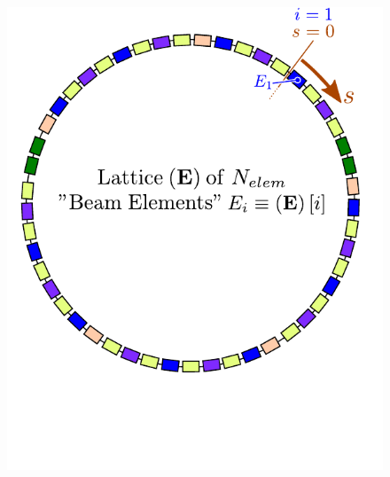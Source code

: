 \documentclass{beamer}
\begin{document}
\begin{frame}[t]
\begin{columns}
\begin{column}{0.35\textwidth}
{\begin{figure}[H]
    \end{figure}
}
{
    \begin{figure}[H]
        \centering
        \includegraphics[width=\textwidth]{presentation_images/fig_tracking_algorithm_02}
    \end{figure}
}
{
    \begin{figure}[H]
        \centering

\end{figure}}
\end{column}
\end{columns}
\end{frame}
\end{document}
